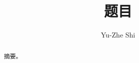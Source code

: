 \documentclass{ctexrep}
\title{题目}
\author{Yu-Zhe Shi}
\begin{document}
\newtheorem{proof}{\hspace{2em}Proof}
\newtheorem{lemma}{\hspace{2em}Lemma}
\newtheorem{definition}{\hspace{2em}Definition}
\newtheorem{proposition}{\hspace{2em}Proposition}
\maketitle
\begin{abstract}
    摘要。
\end{abstract}
\end{document}
